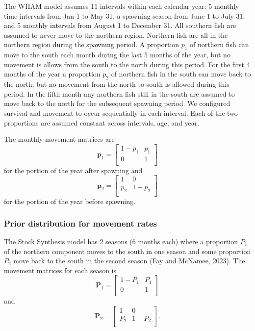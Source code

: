 \documentclass[
]{article}
\begin{document}
The WHAM model assumes 11 intervals within each calendar year: 5 monthly time intervals from Jan 1 to May 31, a spawning season from June 1 to July 31, and 5 monthly intervals from August 1 to December 31. All southern fish are assumed to never move to the northern region. Northern fish are all in the northern region during the spawning period. A proportion \(p_1\) of northern fish can move to the south each month during the last 5 months of the year, but no movement is allows from the south to the north during this period. For the first 4 months of the year a proportion \(p_2\) of northern fish in the south can move back to the north, but no movement from the north to south is allowed during this period. In the fifth month any northern fish still in the south are assumed to move back to the north for the subsequent spawning period. We configured survival and movement to occur sequentially in each interval. Each of the two proportions are assumed constant across intervals, age, and year.

The monthly movement matrices are
\begin{equation*}
\mathbf{p}_{1} = 
  \begin{bmatrix}
     1-p_1 & p_1 \\
     0 & 1 \\
  \end{bmatrix}
\end{equation*}
for the portion of the year after spawning and
\begin{equation*}
\mathbf{p}_{2} = 
  \begin{bmatrix}
     1 &  0 \\
     p_2 & 1-p_2 \\
  \end{bmatrix}
\end{equation*}
for the portion of the year before spawning.

\hypertarget{prior-distribution-for-movement-rates}{%
\subsubsection{Prior distribution for movement rates}\label{prior-distribution-for-movement-rates}}

The Stock Synthesis model has 2 seasons (6 months each) where a proportion \(P_1\) of the northern component moves to the south in one season and some proportion \(P_2\) move back to the south in the second season (Fay and McNamee, 2023). The movement matrices for each season is
\begin{equation*}
\mathbf{P}_{1} = 
  \begin{bmatrix}
     1-P_1 & P_1 \\
     0 & 1 \\
  \end{bmatrix}
\end{equation*}
and
\begin{equation*}
\mathbf{P}_{2} = 
  \begin{bmatrix}
     1 &  0 \\
     P_2 & 1-P_2 \\
  \end{bmatrix}.
\end{equation*}
\end{document}
